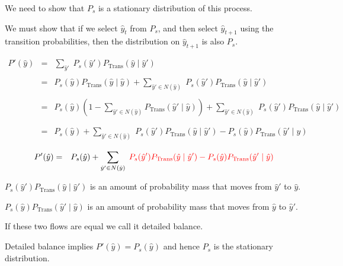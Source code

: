{
We need to show that $P_s$ is a stationary distribution of this process.

\vfill
We must show that if we select $\hat{y}_t$ from $P_s$, and then select $\hat{y}_{t+1}$ using the transition probabilities,
then the distribution on $\hat{y}_{t+1}$ is also $P_s$.


{\huge
\begin{eqnarray*}
P'(\hat{y}) & = & \sum_{\hat{y}'}\;P_s(\hat{y}')P_{\mathrm{Trans}}(\hat{y}\;|\;\hat{y}') \\
\\
& = & P_s(\hat{y})P_{\mathrm{Trans}}(\hat{y}\;|\;\hat{y}) + \sum_{\hat{y}' \in N(\hat{y})}\;P_s(\hat{y}')P_{\mathrm{Trans}}(\hat{y}\;|\;\hat{y}') \\
\\
& = & P_s(\hat{y})\left(1 - \sum_{\hat{y}' \in N(\hat{y})} P_{\mathrm{Trans}}(\hat{y}'\;|\;\hat{y})\right) + \sum_{\hat{y}' \in N(\hat{y})}\;P_s(\hat{y}')P_{\mathrm{Trans}}(\hat{y}\;|\;\hat{y}') \\
\\
\\
& = & P_s(\hat{y}) + \sum_{\hat{y}' \in N(\hat{y})}\;P_s(\hat{y}')P_{\mathrm{Trans}}(\hat{y}\;|\;\hat{y}') - P_s(\hat{y})P_{\mathrm{Trans}}(\hat{y}'\;|\;\hat{y})
\end{eqnarray*}
}


{\huge
\begin{eqnarray*}
P'(\hat{y}) & = & P_s(\hat{y}) + \sum_{\hat{y}' \in N(\hat{y})}\;{\color{red} P_s(\hat{y}')P_{\mathrm{Trans}}(\hat{y}\;|\;\hat{y}') - P_s(\hat{y})P_{\mathrm{Trans}}(\hat{y}'\;|\;\hat{y})}
\end{eqnarray*}
}

\vfill
{\color{red} $P_s(\hat{y}')P_{\mathrm{Trans}}(\hat{y}\;|\;\hat{y}')$} is an amount of probability mass that moves from $\hat{y}'$ to $\hat{y}$.

\vfill
{\color{red} $P_s(\hat{y})P_{\mathrm{Trans}}(\hat{y}'\;|\;\hat{y})$} is an amount of probability mass that moves from $\hat{y}$ to $\hat{y}'$.

\vfill
If these two flows are equal we call it {\color{red} detailed balance}.

\vfill
Detailed balance implies {\color{red} $P'(\hat{y}) = P_s(\hat{y})$} and hence $P_s$ is the stationary distribution.


}
